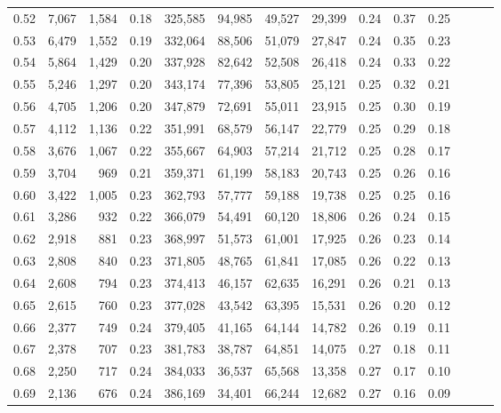 \begin{tabular}{rrrrrrrrrrrrrr}
0.52 &   7,067 &  1,584 &  0.18 &  325,585 &   94,985 &  49,527 &  29,399 &  0.24 &  0.37 &      0.25 \\
0.53 &   6,479 &  1,552 &  0.19 &  332,064 &   88,506 &  51,079 &  27,847 &  0.24 &  0.35 &      0.23 \\
0.54 &   5,864 &  1,429 &  0.20 &  337,928 &   82,642 &  52,508 &  26,418 &  0.24 &  0.33 &      0.22 \\
0.55 &   5,246 &  1,297 &  0.20 &  343,174 &   77,396 &  53,805 &  25,121 &  0.25 &  0.32 &      0.21 \\
0.56 &   4,705 &  1,206 &  0.20 &  347,879 &   72,691 &  55,011 &  23,915 &  0.25 &  0.30 &      0.19 \\
0.57 &   4,112 &  1,136 &  0.22 &  351,991 &   68,579 &  56,147 &  22,779 &  0.25 &  0.29 &      0.18 \\
0.58 &   3,676 &  1,067 &  0.22 &  355,667 &   64,903 &  57,214 &  21,712 &  0.25 &  0.28 &      0.17 \\
0.59 &   3,704 &    969 &  0.21 &  359,371 &   61,199 &  58,183 &  20,743 &  0.25 &  0.26 &      0.16 \\
0.60 &   3,422 &  1,005 &  0.23 &  362,793 &   57,777 &  59,188 &  19,738 &  0.25 &  0.25 &      0.16 \\
0.61 &   3,286 &    932 &  0.22 &  366,079 &   54,491 &  60,120 &  18,806 &  0.26 &  0.24 &      0.15 \\
0.62 &   2,918 &    881 &  0.23 &  368,997 &   51,573 &  61,001 &  17,925 &  0.26 &  0.23 &      0.14 \\
0.63 &   2,808 &    840 &  0.23 &  371,805 &   48,765 &  61,841 &  17,085 &  0.26 &  0.22 &      0.13 \\
0.64 &   2,608 &    794 &  0.23 &  374,413 &   46,157 &  62,635 &  16,291 &  0.26 &  0.21 &      0.13 \\
0.65 &   2,615 &    760 &  0.23 &  377,028 &   43,542 &  63,395 &  15,531 &  0.26 &  0.20 &      0.12 \\
0.66 &   2,377 &    749 &  0.24 &  379,405 &   41,165 &  64,144 &  14,782 &  0.26 &  0.19 &      0.11 \\
0.67 &   2,378 &    707 &  0.23 &  381,783 &   38,787 &  64,851 &  14,075 &  0.27 &  0.18 &      0.11 \\
0.68 &   2,250 &    717 &  0.24 &  384,033 &   36,537 &  65,568 &  13,358 &  0.27 &  0.17 &      0.10 \\
0.69 &   2,136 &    676 &  0.24 &  386,169 &   34,401 &  66,244 &  12,682 &  0.27 &  0.16 &      0.09 \\

\end{tabular}
